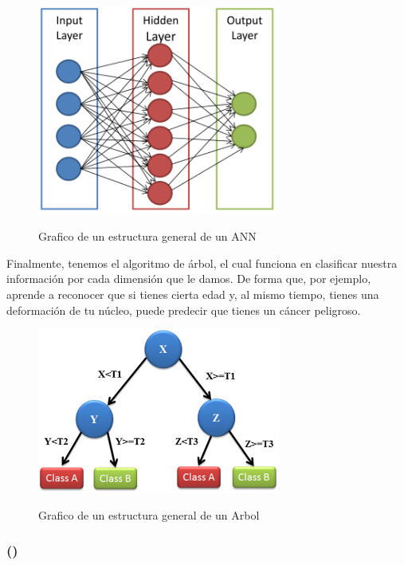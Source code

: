 \documentclass[12pt, letterpaper]{article}
\begin{document}
\begin{figure}[h]
\centering
	\includegraphics[width=8cm]{ann-kourouMachineLearningApplications2015.png}
	\label{fig: ann-classification}
	\caption{Grafico de un estructura general de un ANN}
	\autocite{kourouMachineLearningApplications2015}
\end{figure}

\pagebreak

Finalmente, tenemos el algoritmo de árbol, el cual funciona en clasificar nuestra información por cada dimensión que le damos. De forma que, por ejemplo, aprende a reconocer que si tienes cierta edad y, al mismo tiempo, tienes una deformación de tu núcleo, puede predecir que tienes un cáncer peligroso.

\begin{figure}[h]
\centering
	\includegraphics[width=8cm]{tree-kourouMachineLearningApplications2015.png}
	\label{fig: tree-classification}
	\caption{Grafico de un estructura general de un Arbol}
	\autocite{kourouMachineLearningApplications2015}
\end{figure}

\newpage

\subsubsection{\texorpdfstring{ (\citeauthor{sirinukunwattanaLocalitySensitiveDeep2016})}{}}
\end{document}
